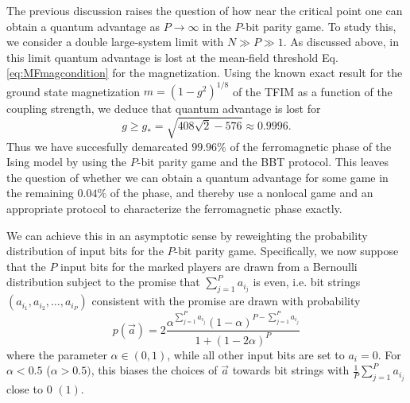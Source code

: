 \documentclass[prb,twocolumn,showpacs,amssymb,superscriptaddress]{revtex4-2}
\begin{document}
The previous discussion raises the question of how near the critical point one can obtain a quantum advantage as $P  \to \infty$ in the $P$-bit parity game. To study this, we consider a double large-system limit with $N \gg P \gg 1$. As discussed above, in this limit quantum advantage is lost at the mean-field threshold Eq. \eqref{eq:MFmagcondition} for the magnetization. Using the known exact result\cite{pfeuty1970one} for the ground state magnetization $m = (1-g^2)^{1/8}$ of the TFIM as a function of the coupling strength, we deduce that quantum advantage is lost for
\begin{equation}
g \geq g_* = \sqrt{408\sqrt{2} - 576} \approx 0.9996.
\end{equation}
Thus we have succesfully demarcated $99.96\%$ of the ferromagnetic phase of the Ising model by using the $P$-bit parity game and the BBT protocol. This leaves the question of whether we can obtain a quantum advantage for some game in the remaining $0.04\%$ of the phase, and thereby use a nonlocal game and an appropriate protocol to characterize the ferromagnetic phase exactly.

We can achieve this in an asymptotic sense by reweighting the probability distribution of input bits for the $P$-bit parity game. Specifically, we now suppose that the $P$ input bits for the marked players are drawn from a Bernoulli distribution subject to the promise that $\sum_{j=1}^P a_{i_j}$ is even, i.e. bit strings $(a_{i_1},a_{i_2},\ldots,a_{i_P})$ consistent with the promise are drawn with probability 
\begin{equation}
p(\vec{a}) = 2\frac{\alpha^{\sum_{j=1}^P a_{i_j}} (1-\alpha)^{P - \sum_{j=1}^P a_{i_j}}}{1+(1-2\alpha)^P}
\end{equation}
where the parameter $\alpha \in (0,1)$, while all other input bits are set to $a_i = 0$.  For $\alpha < 0.5$ ($\alpha > 0.5)$, this biases the choices of $\vec{a}$ towards bit strings with $\frac{1}{P} \sum_{j=1}^P a_{i_j}$ close to $0$ $(1)$.
\end{document}
